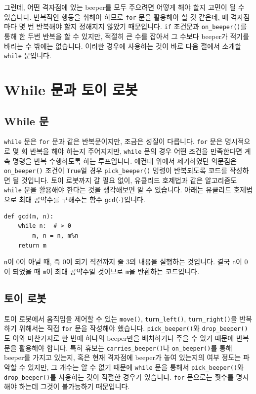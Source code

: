 \documentclass[../main.tex]{subfiles}
\begin{document}
그런데, 어떤 격자점에 있는 beeper를 모두 주으려면 어떻게 해야 할지 고민이 될 수 있습니다.
반복적인 행동을 취해야 하므로 \texttt{for} 문을 활용해야 할 것 같은데, 매 격자점마다 몇 번 반복해야 할지 정해지지 않았기 때문입니다.
\texttt{if} 조건문과 \texttt{on\_beeper()}를 통해 한 두번 반복을 할 수 있지만, 적절히 큰 수를 잡아서 그 수보다 beeper가 적기를 바라는 수 밖에는 없습니다.
이러한 경우에 사용하는 것이 바로 다음 절에서 소개할 \texttt{while} 문입니다.

\section{While 문과 토이 로봇}
\subsection{While 문}
\texttt{while} 문은 \texttt{for} 문과 같은 반복문이지만, 조금은 성질이 다릅니다.
\texttt{for} 문은 명시적으로 몇 회 반복을 해야 하는지 주어지지만, \texttt{while} 문의 경우 어떤 조건을 만족한다면 계속 명령을 반복 수행하도록 하는 루프입니다.
예컨대 위에서 제기하였던 의문점은 \texttt{on\_beeper()} 조건이 \texttt{True}일 경우 \texttt{pick\_beeper()} 명령이 반복되도록 코드를 작성하면 될 것입니다.
토이 로봇까지 갈 필요 없이, 유클리드 호제법과 같은 알고리즘도 \texttt{while} 문을 활용해야 한다는 것을 생각해보면 알 수 있습니다.
아래는 유클리드 호제법으로 최대 공약수를 구해주는 함수 \texttt{gcd($\cdot$)}입니다.
\begin{verbatim}
def gcd(m, n):
    while n:  # > 0
        m, n = n, m%n
    return m
\end{verbatim}
\texttt{n}이 0이 아닐 때, 즉 0이 되기 직전까지 줄 3의 내용을 실행하는 것입니다.
결국 \texttt{n}이 0이 되었을 때 \texttt{m}이 최대 공약수일 것이므로 \texttt{m}을 반환하는 코드입니다.

\subsection{토이 로봇}
토이 로봇에서 움직임을 제어할 수 있는 \texttt{move()}, \texttt{turn\_left()}, \texttt{turn\_right()}을 반복하기 위해서는 직접 \texttt{for} 문을 작성해야 했습니다.
\texttt{pick\_beeper()}와 \texttt{drop\_beeper()}도 이와 마찬가지로 한 번에 하나의 beeper만을 배치하거나 주을 수 있기 때문에 반복문을 활용해야 합니다.
특히 휴보는 \texttt{carries\_beeper()}나 \texttt{on\_beeper()}를 통해 beeper를 가지고 있는지, 혹은 현재 격자점에 beeper가 놓여 있는지의 여부 정도는 파악할 수 있지만, 그 개수는 알 수 없기 때문에 \texttt{while} 문을 통해서 \texttt{pick\_beeper()}와 \texttt{drop\_beeper()}를 사용하는 것이 적절한 경우가 있습니다.
\texttt{for} 문으로는 횟수를 명시해야 하는데 그것이 불가능하기 때문입니다.
\end{document}
